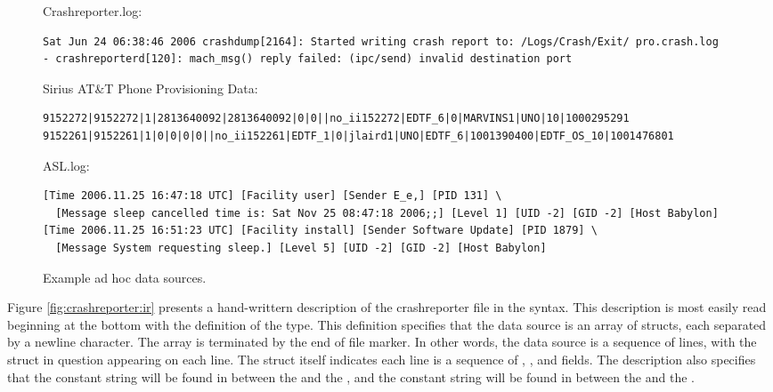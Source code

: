 \begin{figure*}
Crashreporter.log:
{\small \begin{verbatim}
Sat Jun 24 06:38:46 2006 crashdump[2164]: Started writing crash report to: /Logs/Crash/Exit/ pro.crash.log
- crashreporterd[120]: mach_msg() reply failed: (ipc/send) invalid destination port
\end{verbatim}
}

Sirius AT\&T Phone Provisioning Data:
{\small \begin{verbatim}
9152272|9152272|1|2813640092|2813640092|0|0||no_ii152272|EDTF_6|0|MARVINS1|UNO|10|1000295291
9152261|9152261|1|0|0|0|0||no_ii152261|EDTF_1|0|jlaird1|UNO|EDTF_6|1001390400|EDTF_OS_10|1001476801
\end{verbatim}
}

ASL.log:
{\small  \begin{verbatim}
[Time 2006.11.25 16:47:18 UTC] [Facility user] [Sender E_e,] [PID 131] \
  [Message sleep cancelled time is: Sat Nov 25 08:47:18 2006;;] [Level 1] [UID -2] [GID -2] [Host Babylon]
[Time 2006.11.25 16:51:23 UTC] [Facility install] [Sender Software Update] [PID 1879] \
  [Message System requesting sleep.] [Level 5] [UID -2] [GID -2] [Host Babylon]
\end{verbatim}
}


\caption {Example ad hoc data sources.}
\label{fig:example}
\end{figure*}

Figure \ref{fig:crashreporter:ir} presents a hand-writtern description
of the crashreporter file in the \ir{} syntax.  This
description is most easily read beginning at the bottom
with the definition of the \cd{source} type.  This definition specifies that
the data source is an
array of structs, each separated by a newline character. The array
is terminated by the end of file marker.  In other words,
the data source is a sequence of lines, with the struct
in question appearing on each line.  
The struct itself indicates each line is a sequence of
\cd{dateoption}, ,  and  fields.  
The description also specifies that the constant string \cd{"["} 
will be found in between the \cd{kind} and the , and the
constant string \cd{"]: "} will be found in between the \cd{dumpid} and 
the \cd{report}.

